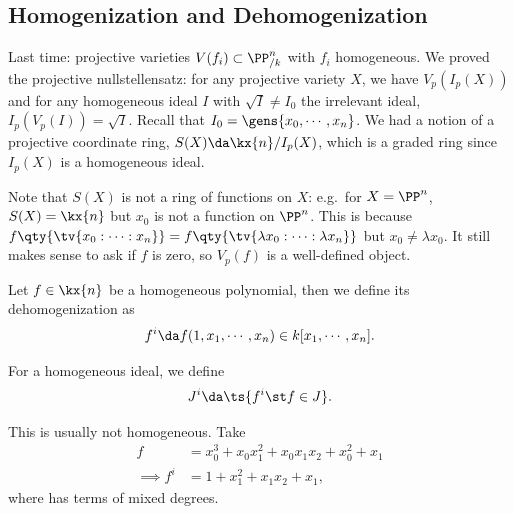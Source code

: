 \hypertarget{homogenization-and-dehomogenization}{%
\subsection{Homogenization and
Dehomogenization}\label{homogenization-and-dehomogenization}}

Last time: projective varieties \(V(f_i) \subset \PP^n_{/k}\) with
\(f_i\) homogeneous. We proved the projective nullstellensatz: for any
projective variety \(X\), we have \(V_p(I_p(X))\) and for any
homogeneous ideal \(I\) with \(\sqrt{I} \neq I_0\) the irrelevant ideal,
\(I_p(V_p(I)) = \sqrt{I}\). Recall that
\(I_0 = \gens{x_0, \cdots, x_n}\). We had a notion of a projective
coordinate ring, \(S(X) \da \kx{n} / I_p(X)\), which is a graded ring
since \(I_p(X)\) is a homogeneous ideal.

\begin{remark}

Note that \(S(X)\) is not a ring of functions on \(X\): e.g.~for
\(X= \PP^n\), \(S(X) = \kx{n}\) but \(x_0\) is not a function on
\(\PP^n\). This is because
\(f\qty{\tv{x_0: \cdots : x_n}} = f\qty{\tv{\lambda x_0: \cdots : \lambda x_n}}\)
but \(x_0\neq \lambda x_0\). It still makes sense to ask if \(f\) is
zero, so \(V_p(f)\) is a well-defined object.

\end{remark}

\begin{definition}

Let \(f\in \kx{n}\) be a homogeneous polynomial, then we define its
dehomogenization as
\begin{align*}  
f^i \da f(1, x_1, \cdots, x_n) \in k[x_1,\cdots, x_n]
.\end{align*}

For a homogeneous ideal, we define
\begin{align*}  
J^i \da \ts{f^i \st f\in J}
.\end{align*}

\end{definition}

\begin{example}

This is usually not homogeneous. Take
\begin{align*}  
f &= x_0^3 + x_0 x_1^2 + x_0 x_1 x_2 + x_0^2 + x_1 \\
\implies f^i &= 1  +x_1^2 + x_1 x_2 + x_1
,\end{align*} where has terms of mixed degrees.

\end{example}

